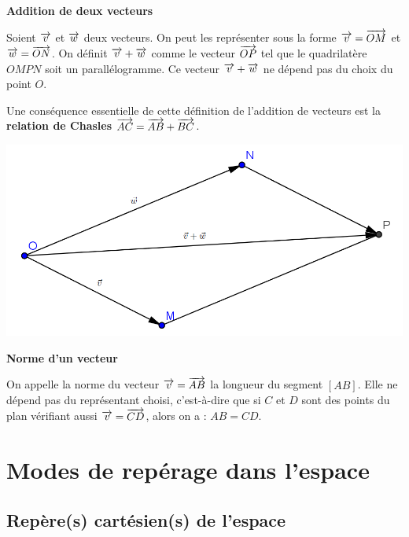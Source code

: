 \documentclass[10pt,oneside]{article}
\begin{document}
\begin{minipage}[c]{.7\linewidth}
\begin{propo}
\textbf{Addition de deux vecteurs}

Soient $\overrightarrow{v}$ et $\overrightarrow{w}$ deux vecteurs. On peut les représenter sous la forme $\overrightarrow{v}=\overrightarrow{OM}$ et $\overrightarrow{w}=\overrightarrow{ON}$. On définit $\overrightarrow{v}+\overrightarrow{w}$ comme le vecteur $\overrightarrow{OP}$ tel que le quadrilatère $OMPN$ soit un parallélogramme. Ce vecteur $\overrightarrow{v}+\overrightarrow{w}$ ne dépend pas du choix du point $O$. 

Une conséquence essentielle de cette définition de l'addition de vecteurs est la \textbf{relation de Chasles} $\overrightarrow{AC}=\overrightarrow{AB}+\overrightarrow{BC}$. 
\end{propo}
\end{minipage}\hfill
\begin{minipage}[c]{.28\linewidth}
\begin{center}
\includegraphics[width=.95\textwidth]{png/somme_vecteur}
\end{center}
\end{minipage}


\begin{propo}
\textbf{Norme d'un vecteur}

On appelle la norme du vecteur $\overrightarrow{v}=\overrightarrow{AB}$ la longueur du segment $[AB]$. Elle ne dépend pas du représentant choisi, c'est-à-dire que si $C$ et $D$ sont des points du plan vérifiant aussi $\overrightarrow{v}=\overrightarrow{CD}$, alors on a : $AB=CD$. 
\end{propo}



\section{Modes de repérage dans l'espace}

\subsection{Repère(s) cartésien(s) de l'espace}
\end{document}
